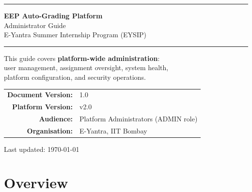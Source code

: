 \documentclass[12pt,a4paper]{article}
\begin{document}

\begin{titlepage}
  \centering
  \vspace*{2cm}

  {\color{adminRed}\rule{\linewidth}{3pt}}
  \vspace{0.5cm}

  {\Huge\bfseries\color{adminRed} EEP Auto-Grading Platform}\\[0.6em]
  {\LARGE\color{adminAccent} Administrator Guide}\\[0.4em]
  {\large\color{darkgray} E-Yantra Summer Internship Program (EYSIP)}

  \vspace{0.5cm}
  {\color{adminRed}\rule{\linewidth}{3pt}}

  \vspace{1.5cm}

  \begin{tcolorbox}[colback=lightgray, colframe=adminAccent, width=0.88\linewidth]
    \centering
    \large This guide covers \textbf{platform-wide administration}: \\
    user management, assignment oversight, system health,\\
    platform configuration, and security operations.
  \end{tcolorbox}

  \vfill

  \begin{tabular}{rl}
    \textbf{Document Version:} & 1.0 \\
    \textbf{Platform Version:} & v2.0 \\
    \textbf{Audience:}         & Platform Administrators (ADMIN role) \\
    \textbf{Organisation:}     & E-Yantra, IIT Bombay \\
  \end{tabular}

  \vspace{1cm}
  {\color{darkgray}\small Last updated: \today}
\end{titlepage}

\tableofcontents
\newpage

\section{Overview}
\end{document}

